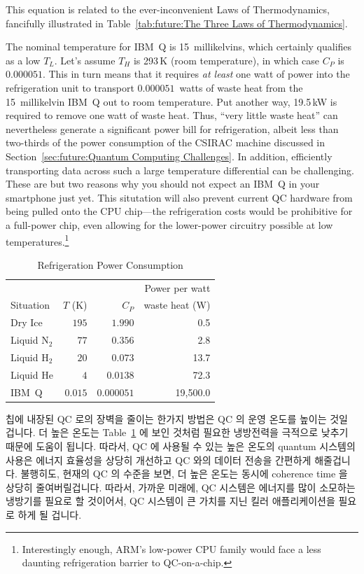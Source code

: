 This equation is related to the ever-inconvenient Laws of Thermodynamics,
fancifully illustrated in
Table~\ref{tab:future:The Three Laws of Thermodynamics}.

The nominal temperature for IBM~Q is 15~millikelvins, which certainly
qualifies as a low $T_L$.
Let's assume $T_H$ is 293\,K (room temperature),
in which case $C_P$ is $0.000051$.
This in turn means that it requires \emph{at least} one watt of
power into the refrigeration unit to transport $0.000051$~watts
of waste heat from the 15~millikelvin IBM~Q out to room temperature.
Put another way, 19.5\,kW is required to remove one watt of waste heat.
Thus, ``very little waste heat'' can nevertheless generate a significant
power bill for refrigeration, albeit less than two-thirds of the power
consumption of the CSIRAC machine discussed in
Section~\ref{sec:future:Quantum Computing Challenges}.
In addition, efficiently transporting data across such a large
temperature differential can be challenging.
These are but two reasons why you should not expect an IBM~Q in your
smartphone just yet.
This situtation will also prevent current QC hardware from being pulled
onto the CPU chip---the refrigeration costs would be prohibitive for
a full-power chip, even allowing for the lower-power circuitry possible
at low temperatures.\footnote{
	Interestingly enough, ARM's low-power CPU family would face
	a less daunting refrigeration barrier to QC-on-a-chip.}
\fi

\begin{table}
\centering\footnotesize
\begin{tabular}{l|r|r|r}
	&	&	& Power per watt \\
Situation
	& $T$ (K)
		& $C_P$	& waste heat (W) \\
\hline
\hline
Dry Ice
	& $195$
		& $1.990$
			& 0.5 \\
\hline
Liquid N$_2$
	& $77$
		& $0.356$
			& 2.8 \\
\hline
Liquid H$_2$
	& $20$
		& $0.073$
			& 13.7 \\
\hline
Liquid He
	& $4$
		& $0.0138$
			& 72.3 \\
\hline
IBM~Q	& $0.015$
		& $0.000051$
			& 19,500.0 \\
\end{tabular}
\caption{Refrigeration Power Consumption}
\label{tab:future:Refrigeration Power Consumption}
\end{table}

칩에 내장된 QC 로의 장벽을 줄이는 한가지 방법은 QC 의 운영 온도를 높이는 것일
겁니다.
더 높은 온도는
Table~\ref{tab:future:Refrigeration Power Consumption} 에 보인 것처럼
필요한 냉방전력을 극적으로 낮추기 때문에 도움이 됩니다.
따라서, QC 에 사용될 수 있는 높은 온도의 quantum 시스템의 사용은 에너지
효율성을 상당히 개선하고 QC 와의 데이터 전송을 간편하게 해줄겁니다.
불행히도, 현재의 QC 의 수준을 보면, 더 높은 온도는 동시에 coherence time 을
상당히 줄여버릴겁니다.
따라서, 가까운 미래에, QC 시스템은 에너지를 많이 소모하는 냉방기를 필요로 할
것이어서, QC 시스템이 큰 가치를 지닌 킬러 애플리케이션을 필요로 하게 될 겁니다.
\iffalse

